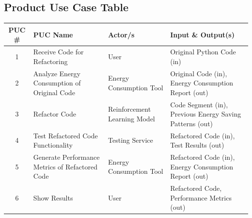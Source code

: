 \documentclass[12pt]{article}
\begin{document}
\subsection{Product Use Case Table}
\scriptsize
\begin{tabular}{ |c|p{3cm}|p{4cm}|p{5cm}| }
  \hline
  PUC \# & PUC Name & Actor/s & Input \& Output(s) \\
  \hline\hline

  1 & Receive Code for Refactoring & User & Original Python Code (in) \\ \hline
  2 & Analyze Energy Consumption of Original Code & Energy Consumption Tool & Original Code (in), Energy Consumption Report (out) \\ \hline
  3 & Refactor Code & Reinforcement Learning Model & Code Segment (in), Previous Energy Saving Patterns (out) \\ \hline
  4 & Test Refactored Code Functionality & Testing Service & Refactored Code (in), Test Results (out) \\ \hline
  5 & Generate Performance Metrics of Refactored Code & Energy Consumption Tool & Refactored Code (in), Energy Consumption Report (out) \\ \hline
  6 & Show Results & User & Refactored Code, Performance Metrics (out) \\

  \hline
\end{tabular}
\end{document}
